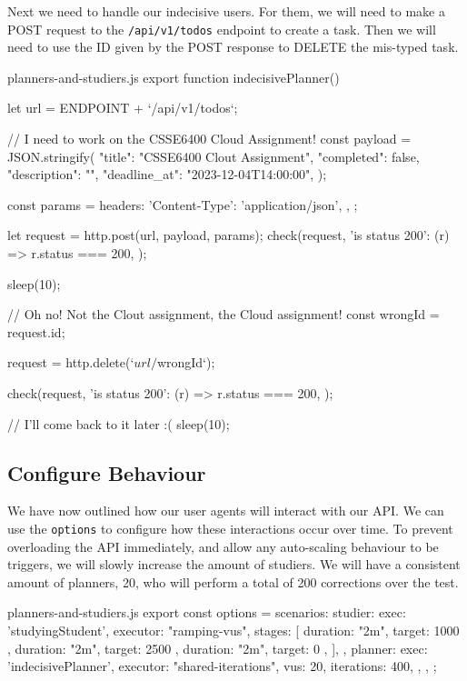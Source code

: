 \documentclass{csse4400}
\begin{document}
Next we need to handle our indecisive users.
For them, we will need to make a POST request to the \texttt{/api/v1/todos} endpoint to create a task.
Then we will need to use the ID given by the POST response to DELETE the mis-typed task.

\begin{code}[language=JavaScript,numbers=none]{planners-and-studiers.js}
export function indecisivePlanner() {
    let url = ENDPOINT + `/api/v1/todos`;

    // I need to work on the CSSE6400 Cloud Assignment!
    const payload = JSON.stringify({
        "title": "CSSE6400 Clout Assignment",
        "completed": false,
        "description": "",
        "deadline_at": "2023-12-04T14:00:00",
    });

    const params = {
        headers: {
            'Content-Type': 'application/json',
        },
    };

    let request = http.post(url, payload, params);
    check(request, {
        'is status 200': (r) => r.status === 200,
    });

    sleep(10);

    // Oh no! Not the Clout assignment, the Cloud assignment!
    const wrongId = request.id;

    request = http.delete(`${url}/${wrongId}`);

    check(request, {
        'is status 200': (r) => r.status === 200,
    });

    // I'll come back to it later :(
    sleep(10);
}
\end{code}

\subsection{Configure Behaviour}

We have now outlined how our user agents will interact with our API.
We can use the \texttt{options} to configure how these interactions occur over time.
To prevent overloading the API immediately,
and allow any auto-scaling behaviour to be triggers,
we will slowly increase the amount of studiers.
We will have a consistent amount of planners, 20,
who will perform a total of 200 corrections over the test.

\begin{code}[language=JavaScript,numbers=none]{planners-and-studiers.js}
export const options = {
    scenarios: {
        studier: {
            exec: 'studyingStudent',
            executor: "ramping-vus",
            stages: [
                { duration: "2m", target: 1000 },
                { duration: "2m", target: 2500 },
                { duration: "2m", target: 0 },
            ],
        },
        planner: {
            exec: 'indecisivePlanner',
            executor: "shared-iterations",
            vus: 20,
            iterations: 400,
        },
    },
};
\end{code}
\end{document}
